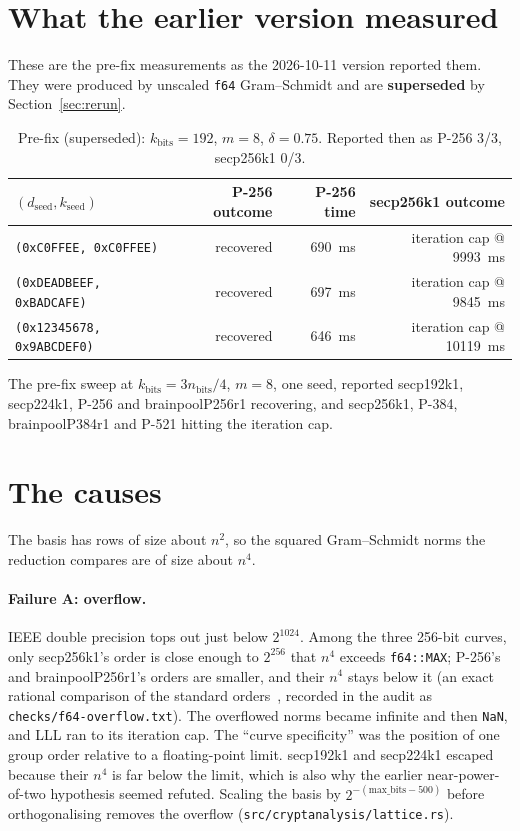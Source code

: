 \documentclass[10pt,a4paper]{article}
\begin{document}
\section{What the earlier version measured}
\label{sec:prefix}

These are the pre-fix measurements as the 2026-10-11 version reported
them. They were produced by unscaled \texttt{f64} Gram--Schmidt and
are \textbf{superseded} by Section~\ref{sec:rerun}.

\begin{table}[h]
\centering
\begin{tabular}{lrrr}
\toprule
$(d_{\text{seed}}, k_{\text{seed}})$ & P-256 outcome & P-256 time & secp256k1 outcome \\
\midrule
\texttt{(0xC0FFEE, 0xC0FFEE)}           & recovered & 690~ms  & iteration cap @ 9993~ms \\
\texttt{(0xDEADBEEF, 0xBADCAFE)}        & recovered & 697~ms  & iteration cap @ 9845~ms \\
\texttt{(0x12345678, 0x9ABCDEF0)}       & recovered & 646~ms  & iteration cap @ 10119~ms \\
\bottomrule
\end{tabular}
\caption{Pre-fix (superseded): $k_{\text{bits}} = 192$, $m = 8$,
$\delta = 0.75$. Reported then as P-256 3/3, secp256k1 0/3.}
\label{tab:prefix}
\end{table}

The pre-fix sweep at $k_{\text{bits}} = 3 n_{\text{bits}}/4$, $m = 8$,
one seed, reported secp192k1, secp224k1, P-256 and brainpoolP256r1
recovering, and secp256k1, P-384, brainpoolP384r1 and P-521 hitting
the iteration cap.

\section{The causes}

The basis has rows of size about $n^2$, so the squared Gram--Schmidt
norms the reduction compares are of size about $n^4$.

\paragraph{Failure A: overflow.} IEEE double precision tops out just
below $2^{1024}$. Among the three 256-bit curves, only secp256k1's
order is close enough to $2^{256}$ that $n^4$ exceeds
\texttt{f64::MAX}; P-256's and brainpoolP256r1's orders are smaller,
and their $n^4$ stays below it (an exact rational comparison of the
standard orders~\cite{fips186,sec2}, recorded in the audit as
\texttt{checks/f64-overflow.txt}). The overflowed norms became
infinite and then \texttt{NaN}, and LLL ran to its iteration cap. The
``curve specificity'' was the position of one group order relative to
a floating-point limit. secp192k1 and secp224k1 escaped because their
$n^4$ is far below the limit, which is also why the earlier
near-power-of-two hypothesis seemed refuted. Scaling the basis by
$2^{-(\text{max\_bits} - 500)}$ before orthogonalising removes the
overflow (\texttt{src/cryptanalysis/lattice.rs}).
\end{document}
